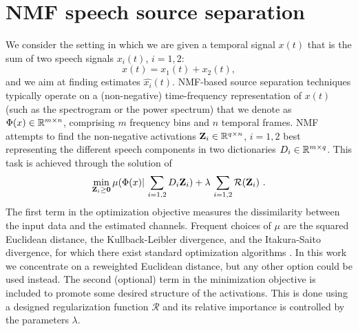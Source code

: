 \section{NMF speech source separation}
\label{nmfsec}

%
We consider the setting in which we are given a temporal signal $x(t)$ that is the sum of  
two speech signals $x_i(t)$, $i=1,2$:
$$ x(t) = x_1(t) + x_2(t),$$
and we aim at finding estimates $\widehat{x_i}(t)$.
NMF-based source separation 
techniques typically operate on a (non-negative) time-frequency representation of $x(t)$ (such as the spectrogram or the power spectrum)
that we denote as $\Phi(x) \in \mathbb{R}^{m \times n}$, comprising $m$ frequency bins and $n$ temporal frames. 
NMF attempts to find the non-negative activations $\bm{\mathrm{Z}}_i \in \mathbb{R}^{q \times n}$, $i=1,2$ 
best representing the different speech components in two dictionaries ${D}_{i} \in \mathbb{R}^{m \times q}$.
%
This task is achieved through the solution of %
\begin{eqnarray}
\label{eq:optim_general}
\min_{ \bm{\mathrm{Z}}_i \ge \bm{\mathrm{0}}  } \mu( \Phi(x) |  \, \sum_{i=1,2} {D}_i \bm{\mathrm{Z}}_{i}  ) + 
\lambda\, \sum_{i=1,2} \mathcal{R}(\bm{\mathrm{Z}}_i)~.
\end{eqnarray}
The first term in the optimization objective measures the dissimilarity between the input data and the estimated channels. 
Frequent choices of $\mu$ are the squared Euclidean distance,
the Kullback-Leibler divergence, and the Itakura-Saito divergence, for which there exist standard optimization algorithms \cite{fevotte2011algorithms}.
In this work we concentrate on a reweighted Euclidean distance, but any other option could be used instead.
%
%
The second (optional) term in the minimization objective is included to promote some desired structure of the activations. This is done using a designed regularization function $\mathcal{R}$ 
and its relative importance is controlled by the parameters $\lambda$. 


